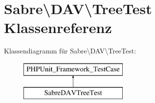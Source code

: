 \hypertarget{class_sabre_1_1_d_a_v_1_1_tree_test}{}\section{Sabre\textbackslash{}D\+AV\textbackslash{}Tree\+Test Klassenreferenz}
\label{class_sabre_1_1_d_a_v_1_1_tree_test}
Klassendiagramm für Sabre\textbackslash{}D\+AV\textbackslash{}Tree\+Test\+:\begin{figure}[H]
\begin{center}
\leavevmode
\includegraphics[height=2.000000cm]{class_sabre_1_1_d_a_v_1_1_tree_test}
\end{center}
\end{figure}
